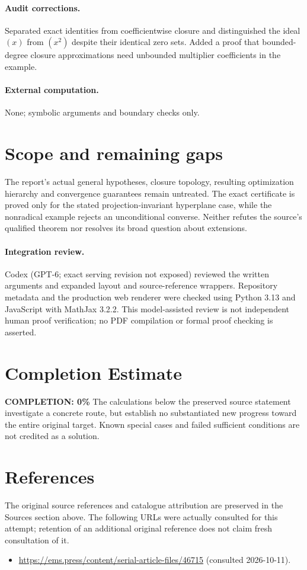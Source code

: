 \documentclass[11pt]{article}
\begin{document}
\paragraph{Audit corrections.} Separated exact identities from coefficientwise closure and distinguished the ideal $(x)$ from $(x^2)$ despite their identical zero sets. Added a proof that bounded-degree closure approximations need unbounded multiplier coefficients in the example.
\paragraph{External computation.} None; symbolic arguments and boundary checks only.
\section{Scope and remaining gaps}
The report's actual general hypotheses, closure topology, resulting optimization hierarchy and convergence guarantees remain untreated. The exact certificate is proved only for the stated projection-invariant hyperplane case, while the nonradical example rejects an unconditional converse. Neither refutes the source's qualified theorem nor resolves its broad question about extensions.
\paragraph{Integration review.} Codex (GPT-6; exact serving revision not exposed) reviewed the written arguments and expanded layout and source-reference wrappers. Repository metadata and the production web renderer were checked using Python 3.13 and JavaScript with MathJax 3.2.2. This model-assisted review is not independent human proof verification; no PDF compilation or formal proof checking is asserted.

\section{Completion Estimate}
\noindent\textbf{COMPLETION: 0\%}
The calculations below the preserved source statement investigate a concrete route,
but establish no substantiated new progress toward the entire original target.
Known special cases and failed sufficient conditions are not credited as a solution.
\section{References}
The original source references and catalogue attribution are preserved in the
Sources section above. The following URLs were actually consulted for this attempt;
retention of an additional original reference does not claim fresh consultation of it.
\begin{itemize}
\item \url{https://ems.press/content/serial-article-files/46715} (consulted 2026-10-11). 
\end{itemize}
\end{document}
